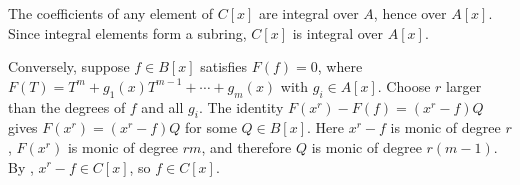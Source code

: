 The coefficients of any element of $C[x]$ are integral over $A$, hence over $A[x]$. Since integral elements form a subring, $C[x]$ is integral over $A[x]$.

Conversely, suppose $f\in B[x]$ satisfies $F(f)=0$, where $F(T)=T^m+g_1(x)T^{m-1}+\cdots+g_m(x)$ with $g_i\in A[x]$. Choose $r$ larger than the degrees of $f$ and all $g_i$. The identity $F(x^r)-F(f)=(x^r-f)Q$ gives $F(x^r)=(x^r-f)Q$ for some $Q\in B[x]$. Here $x^r-f$ is monic of degree $r$, $F(x^r)$ is monic of degree $rm$, and therefore $Q$ is monic of degree $r(m-1)$. By , $x^r-f\in C[x]$, so $f\in C[x]$.
